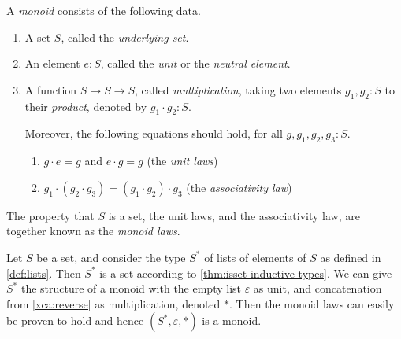 \begin{definition}\label{def:monoid}
  A \emph{monoid} consists of the following data.
  \begin{enumerate}
  \item\label{struc:monoid-set} A set $S$, called the \emph{underlying set}.
  \item\label{struc:monoid-unit} An element $e:S$, called the \emph{unit} or the \emph{neutral element}.
  \item\label{struc:monoid-mult} A function $S\to S\to S$, called \emph{multiplication},
    taking two elements $g_1,g_2:S$ to their \emph{product}, denoted by $g_1\cdot g_2:S$.
    \par \noindent
    Moreover, the following equations should hold, for all $g,g_1,g_2,g_3 : S$.
    \begin{enumerate}[label=(\alph*),ref=\ref{struc:monoid-mult} (\alph*)]
    \item\label{monoid:unit-laws} $g\cdot e=g$ and $e\cdot g=g$ (the \emph{unit laws})
    \item\label{monoid:ass-law} $g_1\cdot(g_2\cdot g_3)=(g_1\cdot g_2)\cdot g_3$ 
         (the \emph{associativity law})
    \end{enumerate}
  \end{enumerate}
 The property that $S$ is a set, the
  unit laws, and the associativity law, are together known as the \emph{monoid laws}.
\end{definition}

\begin{example}\label{exa:monoid}
Let $S$ be a set, and consider the type $S^*$ of lists of elements of $S$
as defined in \cref{def:lists}. Then $S^*$ is a set according to
\cref{thm:isset-inductive-types}. We can give $S^*$ the structure
of a monoid with the empty list $\varepsilon$ as unit, and concatenation
from \cref{xca:reverse} as multiplication, denoted $\ast$.
Then the monoid laws can easily be proven to hold and hence
$(S^*,\varepsilon,\ast)$ is a monoid.
\end{example}



